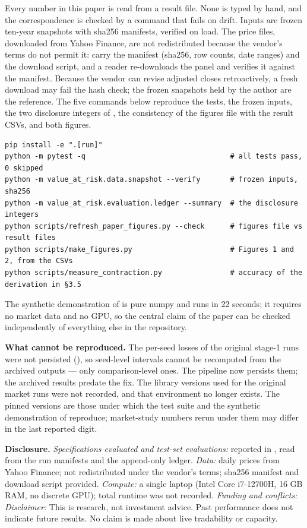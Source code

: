 Every number in this paper is read from a result file. None is typed by hand, and the
correspondence is checked by a command that fails on drift. Inputs are frozen ten-year snapshots
with sha256 manifests, verified on load. The price files, downloaded from Yahoo Finance, are not
redistributed because the vendor's terms do not permit it: \archivephrase{}
carry the manifest (sha256, row counts, date ranges) and the download script, and a reader
re-downloads the panel and verifies it against the manifest. Because the vendor can revise
adjusted closes retroactively, a fresh download may fail the hash check; the frozen snapshots
held by the author are the reference. The five commands below reproduce the tests, the frozen
inputs, the two disclosure integers of , the consistency of the figures file with the result
CSVs, and both figures.

\begin{verbatim}
pip install -e ".[run]"
python -m pytest -q                                  # all tests pass, 0 skipped
python -m value_at_risk.data.snapshot --verify       # frozen inputs, sha256
python -m value_at_risk.evaluation.ledger --summary  # the disclosure integers
python scripts/refresh_paper_figures.py --check      # figures file vs result files
python scripts/make_figures.py                       # Figures 1 and 2, from the CSVs
python scripts/measure_contraction.py                # accuracy of the derivation in §3.5
\end{verbatim}

The synthetic demonstration of  is pure numpy and runs in 22 seconds; it requires no market
data and no GPU, so the central claim of the paper can be checked independently of everything
else in the repository.

\textbf{What cannot be reproduced.} The per-seed losses of the original stage-1 runs were not
persisted (), so seed-level intervals cannot be recomputed from the archived outputs --- only
comparison-level ones. The pipeline now persists them; the archived results predate the fix. The library versions used for the original market runs were not recorded, and that environment no longer exists. The pinned versions are those under which the test suite and the synthetic demonstration of  reproduce; market-study numbers rerun under them may differ in the last reported digit.

\textbf{Disclosure.} \emph{Specifications evaluated and test-set evaluations:} reported in , read from
the run manifests and the append-only ledger. \emph{Data:} daily prices from Yahoo Finance; not
redistributed under the vendor's terms; sha256 manifest and download script provided.
\emph{Compute:} a single laptop (Intel Core i7-12700H, 16 GB RAM, no discrete GPU); total runtime was not recorded. \emph{Funding and
conflicts:} \fundingstatement{} \emph{Disclaimer:} This is
research, not investment advice. Past performance does not indicate future results. No claim is
made about live tradability or capacity.

\codeavailability{}
